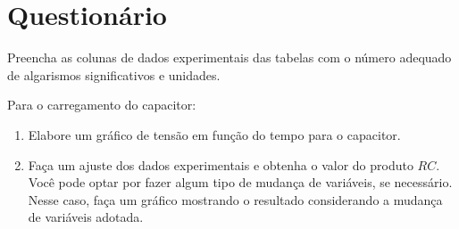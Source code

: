 \begin{fullwidth}
\noindent{}
\vspace{5mm}

\noindent{}

\noindent{}

\noindent{}

\noindent{}

\noindent{}
\end{fullwidth}

\vspace{5mm}

\section{Questionário}

\begin{question}[type={exam}]{2}
Preencha as colunas de dados experimentais das tabelas com o número adequado de algarismos significativos e unidades.
\end{question}

\begin{question}[type={exam}]{3}
Para o carregamento do capacitor:
    \begin{enumerate}[label=\roman*.]
        \item Elabore um gráfico de tensão em função do tempo para o capacitor.
        \item Faça um ajuste dos dados experimentais e obtenha o valor do produto $RC$. Você pode optar por fazer algum tipo de mudança de variáveis, se necessário. Nesse caso, faça um gráfico mostrando o resultado considerando a mudança de variáveis adotada.
    \end{enumerate}
\end{question}

